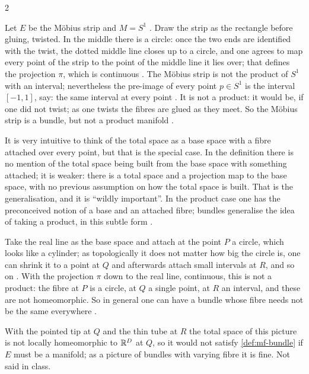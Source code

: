 \begin{paracol}{2}
\begin{example}\label{ex:mf-moebius}
Let $E$ be the Möbius strip and $M=S^1$ . Draw the strip as the rectangle before gluing, twisted. In the middle there is a circle: once the two ends are identified with the twist, the dotted middle line closes up to a circle, and one agrees to map every point of the strip
to the point of the middle line it lies over; that defines the projection $\pi$, which is continuous . The Möbius strip is not the product of $S^1$ with an interval; nevertheless the
pre-image of every point $p\in S^1$ is the interval $[-1,1]$, say: the same interval at every point . It is not a product: it would be, if one did not twist; as one twists the fibres are glued as they meet.
So the Möbius strip is a bundle, but not a product manifold .
\end{example}
\begin{intuition}\label{int:mf-weaker}
It is very intuitive to think of the total space as a base space with a fibre attached over every point, but that is the special case. In the definition there is no mention of the total space being built from the base space with something attached;
it is weaker: there is a total space and a projection map to the base space, with no previous assumption on how the total space is built. That is the generalisation, and it is ``wildly important''. In the product case one has the preconceived notion of a base and
an attached fibre; bundles generalise the idea of taking a product, in this subtle form .
\end{intuition}

\begin{example}\label{ex:mf-varying}
Take the real line as the base space and attach at the point $P$ a circle, which looks like a cylinder; as topologically it does not matter how big the circle is, one can shrink it to a point at $Q$ and afterwards attach small intervals at $R$,
and so on . With the projection $\pi$ down to the real line, continuous, this is not a product: the fibre at $P$ is a circle, at $Q$ a single point, at $R$ an interval, and these are not homeomorphic. So in general one
can have a bundle whose fibre needs not be the same everywhere .
\end{example}
\begin{coursenote}
With the pointed tip at $Q$ and the thin tube at $R$ the total space of this picture is not locally homeomorphic to $\mathbb{R}^D$ at $Q$, so it would not satisfy \cref{def:mf-bundle} if $E$ must be a manifold; as a picture of bundles with varying fibre
it is fine. Not said in class.
\end{coursenote}


\end{paracol}

